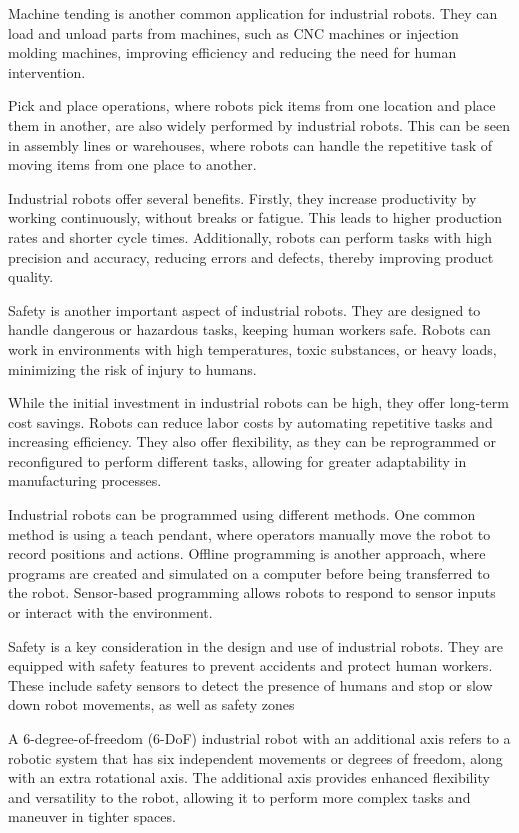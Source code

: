 Machine tending is another common application for industrial robots. They can load and unload parts from machines, such as CNC machines or injection molding machines, improving efficiency and reducing the need for human intervention.

Pick and place operations, where robots pick items from one location and place them in another, are also widely performed by industrial robots. This can be seen in assembly lines or warehouses, where robots can handle the repetitive task of moving items from one place to another.

Industrial robots offer several benefits. Firstly, they increase productivity by working continuously, without breaks or fatigue. This leads to higher production rates and shorter cycle times. Additionally, robots can perform tasks with high precision and accuracy, reducing errors and defects, thereby improving product quality.

Safety is another important aspect of industrial robots. They are designed to handle dangerous or hazardous tasks, keeping human workers safe. Robots can work in environments with high temperatures, toxic substances, or heavy loads, minimizing the risk of injury to humans.

While the initial investment in industrial robots can be high, they offer long-term cost savings. Robots can reduce labor costs by automating repetitive tasks and increasing efficiency. They also offer flexibility, as they can be reprogrammed or reconfigured to perform different tasks, allowing for greater adaptability in manufacturing processes.

Industrial robots can be programmed using different methods. One common method is using a teach pendant, where operators manually move the robot to record positions and actions. Offline programming is another approach, where programs are created and simulated on a computer before being transferred to the robot. Sensor-based programming allows robots to respond to sensor inputs or interact with the environment.

Safety is a key consideration in the design and use of industrial robots. They are equipped with safety features to prevent accidents and protect human workers. These include safety sensors to detect the presence of humans and stop or slow down robot movements, as well as safety zones

A 6-degree-of-freedom (6-DoF) industrial robot with an additional axis refers to a robotic system that has six independent movements or degrees of freedom, along with an extra rotational axis. The additional axis provides enhanced flexibility and versatility to the robot, allowing it to perform more complex tasks and maneuver in tighter spaces.

